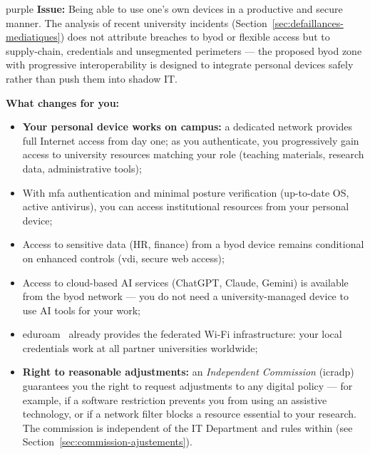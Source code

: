 \bigskip

\begin{stakeholderbox}{purple}
\textbf{Issue:} Being able to use one's own devices in a productive
and secure manner. The analysis of recent university incidents
(Section~\ref{sec:defaillances-mediatiques}) does not attribute breaches
to \gls{byod} or flexible access but to supply-chain, credentials and
unsegmented perimeters --- the proposed \gls{byod} zone with progressive
interoperability is designed to integrate personal devices safely
rather than push them into shadow IT.

\medskip
\textbf{What changes for you:}
\begin{itemize}[nosep]
    \item \textbf{Your personal device works on campus:} a
    dedicated network provides full Internet access from day one;
    as you authenticate, you progressively gain access to
    university resources matching your role (teaching materials,
    research data, administrative tools);
    \item With \gls{mfa} authentication and minimal posture verification
    (up-to-date OS, active antivirus), you can access
    institutional resources from your personal device;
    \item Access to sensitive data (HR, finance) from a \gls{byod}
    device remains conditional on enhanced controls (\gls{vdi}, secure
    web access);
    \item Access to cloud-based AI services (ChatGPT, Claude,
    Gemini) is available from the \gls{byod} network --- you do
    not need a university-managed device to use AI tools for
    your work;
    \item \gls{eduroam}~\cite{eduroam} already provides the federated
    Wi-Fi infrastructure: your local credentials work at all
    partner universities worldwide;
    \item \textbf{Right to reasonable adjustments:} an
    \emph{Independent Commission} (\gls{icradp}) guarantees you
    the right to request adjustments to any digital policy ---
    for example, if a software restriction prevents you from
    using an assistive technology, or if a network filter blocks
    a resource essential to your research. The commission is
    independent of the IT Department and rules within
    (see Section~\ref{sec:commission-ajustements}).
\end{itemize}
\end{stakeholderbox}


